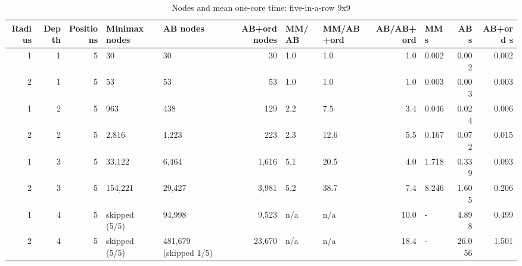 \begin{table}[!t]
\centering
\caption{Nodes and mean one-core time: five-in-a-row 9x9}
\label{tab:nodes_gomoku9}
\small
\begin{tabular}{rrrllrllrlrr}
\toprule
Radius & Depth & Positions & Minimax nodes & AB nodes & AB+ord nodes & MM/AB & MM/AB+ord & AB/AB+ord & MM s & AB s & AB+ord s \\
\midrule
1 & 1 & 5 & 30 & 30 & 30 & 1.0 & 1.0 & 1.0 & 0.002 & 0.002 & 0.002 \\
2 & 1 & 5 & 53 & 53 & 53 & 1.0 & 1.0 & 1.0 & 0.003 & 0.003 & 0.003 \\
1 & 2 & 5 & 963 & 438 & 129 & 2.2 & 7.5 & 3.4 & 0.046 & 0.024 & 0.006 \\
2 & 2 & 5 & 2,816 & 1,223 & 223 & 2.3 & 12.6 & 5.5 & 0.167 & 0.072 & 0.015 \\
1 & 3 & 5 & 33,122 & 6,464 & 1,616 & 5.1 & 20.5 & 4.0 & 1.718 & 0.339 & 0.093 \\
2 & 3 & 5 & 154,221 & 29,427 & 3,981 & 5.2 & 38.7 & 7.4 & 8.246 & 1.605 & 0.206 \\
1 & 4 & 5 & skipped (5/5) & 94,998 & 9,523 & n/a & n/a & 10.0 & - & 4.898 & 0.499 \\
2 & 4 & 5 & skipped (5/5) & 481,679 (skipped 1/5) & 23,670 & n/a & n/a & 18.4 & - & 26.056 & 1.501 \\
\bottomrule
\end{tabular}
\end{table}
